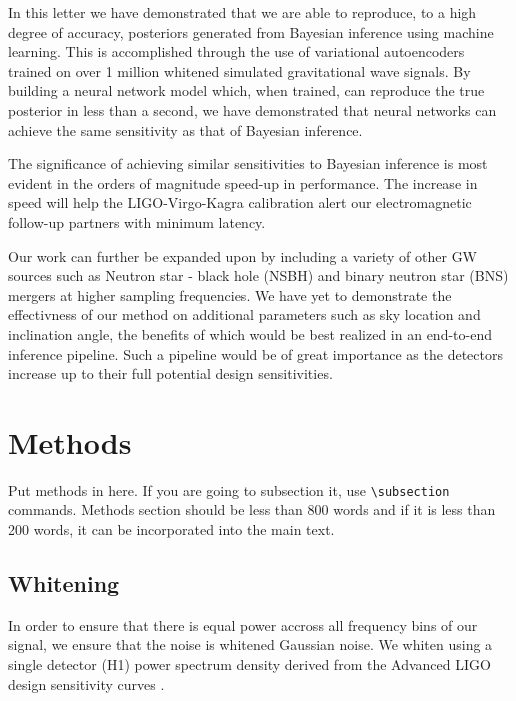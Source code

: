 \documentclass[%
showpacs,
 amsmath,amssymb,
 aps,
 twocolumn,
 prl,
 reprint,
floatfix,
]{revtex4-1}
\begin{document}
%
%
In this letter we have demonstrated that we 
are able to reproduce, to a high degree of accuracy, posteriors 
generated from Bayesian inference using machine learning. This 
is accomplished through the use of variational autoencoders 
trained on over 1 million whitened simulated gravitational 
wave signals. By building a neural network model which, 
when trained, can reproduce the true posterior in less than a 
second, we have demonstrated that neural networks 
can achieve the same sensitivity as that of Bayesian 
inference.

The significance of achieving similar sensitivities 
to Bayesian inference is most evident in the 
orders of magnitude speed-up in performance. The increase
in speed will help the LIGO-Virgo-Kagra calibration 
alert our electromagnetic follow-up partners with 
minimum latency.

Our work can further be expanded upon by including 
a variety of other GW sources such as Neutron star - 
black hole (NSBH) and binary neutron star (BNS) mergers 
at higher sampling frequencies. We have yet to demonstrate 
the effectivness of our method on additional parameters 
such as sky location and inclination angle, the benefits of which 
would be best realized in an end-to-end inference pipeline. 
Such a pipeline would be of great importance as the detectors 
increase up to their full potential design sensitivities.

\section{Methods}
Put methods in here.  If you are going to subsection it, use
\verb|\subsection| commands.  Methods section should be less than
800 words and if it is less than 200 words, it can be incorporated
into the main text.

\subsection{Whitening}

In order to ensure 
that there is equal power accross all
frequency bins of our signal, we ensure that the noise is whitened Gaussian
noise. We whiten using a single detector (H1) power spectrum density derived from the
Advanced LIGO design sensitivity curves \cite{2016LRR....19....1A}. 
\end{document}
